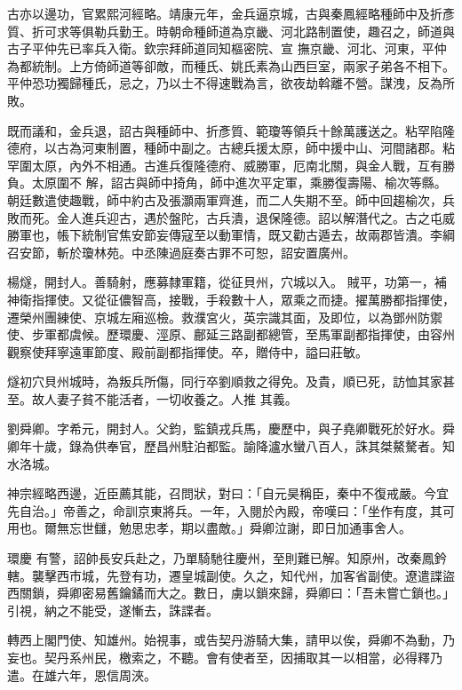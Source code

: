 \begin{pinyinscope}
 古亦以邊功，官累熙河經略。靖康元年，金兵逼京城，古與秦鳳經略種師中及折彥質、折可求等俱勒兵勤王。時朝命種師道為京畿、河北路制置使，趣召之，師道與古子平仲先已率兵入衛。欽宗拜師道同知樞密院、宣
 撫京畿、河北、河東，平仲為都統制。上方倚師道等卻敵，而種氏、姚氏素為山西巨室，兩家子弟各不相下。平仲恐功獨歸種氏，忌之，乃以士不得速戰為言，欲夜劫斡離不營。謀洩，反為所敗。



 既而議和，金兵退，詔古與種師中、折彥質、範瓊等領兵十餘萬護送之。粘罕陷隆德府，以古為河東制置，種師中副之。古總兵援太原，師中援中山、河間諸郡。粘罕圍太原，內外不相通。古進兵復隆德府、威勝軍，厄南北關，與金人戰，互有勝負。太原圍不
 解，詔古與師中掎角，師中進次平定軍，乘勝復壽陽、榆次等縣。朝廷數遣使趣戰，師中約古及張灝兩軍齊進，而二人失期不至。師中回趨榆次，兵敗而死。金人進兵迎古，遇於盤陀，古兵潰，退保隆德。詔以解潛代之。古之屯威勝軍也，帳下統制官焦安節妄傳寇至以動軍情，既又勸古遁去，故兩郡皆潰。李綱召安節，斬於瓊林苑。中丞陳過庭奏古罪不可恕，詔安置廣州。



 楊燧，開封人。善騎射，應募隸軍籍，從征貝州，穴城以入。
 賊平，功第一，補神衛指揮使。又從征儂智高，接戰，手殺數十人，眾乘之而捷。擢萬勝都指揮使，遷榮州團練使、京城左廂巡檢。救濮宮火，英宗識其面，及即位，以為鄧州防禦使、步軍都虞候。歷環慶、涇原、鄜延三路副都總管，至馬軍副都指揮使，由容州觀察使拜寧遠軍節度、殿前副都指揮使。卒，贈侍中，謚曰莊敏。



 燧初穴貝州城時，為叛兵所傷，同行卒劉順救之得免。及貴，順已死，訪恤其家甚至。故人妻子貧不能活者，一切收養之。人推
 其義。



 劉舜卿。字希元，開封人。父鈞，監鎮戎兵馬，慶歷中，與子堯卿戰死於好水。舜卿年十歲，錄為供奉官，歷昌州駐泊都監。諭降瀘水蠻八百人，誅其桀鰲驁者。知水洛城。



 神宗經略西邊，近臣薦其能，召問狀，對曰：「自元昊稱臣，秦中不復戒嚴。今宜先自治。」帝善之，命訓京東將兵。一年，入閱於內殿，帝嘆曰：「坐作有度，其可用也。爾無忘世讎，勉思忠孝，期以盡敵。」舜卿泣謝，即日加通事舍人。



 環慶
 有警，詔帥長安兵赴之，乃單騎馳往慶州，至則難已解。知原州，改秦鳳鈐轄。襲擊西市城，先登有功，遷皇城副使。久之，知代州，加客省副使。遼遣諜盜西關鎖，舜卿密易舊鑰鐍而大之。數日，虜以鎖來歸，舜卿曰：「吾未嘗亡鎖也。」引視，納之不能受，遂慚去，誅諜者。



 轉西上閣門使、知雄州。始視事，或告契丹游騎大集，請甲以俟，舜卿不為動，乃妄也。契丹系州民，檄索之，不聽。會有使者至，因捕取其一以相當，必得釋乃遣。在雄六年，恩信周浹。




\end{pinyinscope}
